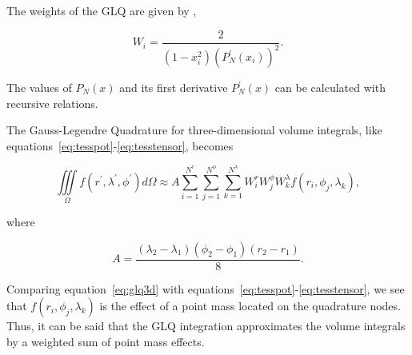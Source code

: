 \documentclass[paper,twocolumn,twoside]{geophysics}
\begin{document}
The weights of the GLQ are given by \citep{Hildebrand1987},

\begin{equation}
    W_i = \frac{2}{(1 - x_i^2)(P^\prime_N(x_i))^2}.
    \label{eq:glq_weights}
\end{equation}

\noindent
The values of $P_N(x)$ and its first derivative $P^\prime_N(x)$
can be calculated with recursive relations.

The Gauss-Legendre Quadrature for three-dimensional volume integrals,
like equations~\ref{eq:tesspot}-\ref{eq:tesstensor},
becomes \citep{Asgharzadeh2007}

\begin{equation}
    \iiint\limits_{\Omega}
    f(r^\prime, \lambda^\prime, \phi^\prime)
    d\Omega
    \approx
    A
    \sum\limits_{i=1}^{N^r}
    \sum\limits_{j=1}^{N^\phi}
    \sum\limits_{k=1}^{N^\lambda}
    W_i^r W_j^\phi W_k^\lambda
    f(r_i, \phi_j, \lambda_k),
    \label{eq:glq3d}
\end{equation}

\noindent
where

\begin{equation}
    A = \frac{(\lambda_2 - \lambda_1)(\phi_2 - \phi_1)(r_2 - r_1)}{8}.
\end{equation}

Comparing equation~\ref{eq:glq3d} with
equations~\ref{eq:tesspot}-\ref{eq:tesstensor},
we see that $f(r_i, \phi_j, \lambda_k)$ is the effect of a point
mass located on the quadrature nodes.
Thus, it can be said that the GLQ integration
approximates the volume integrals  by a
weighted sum of point mass effects.
\end{document}
